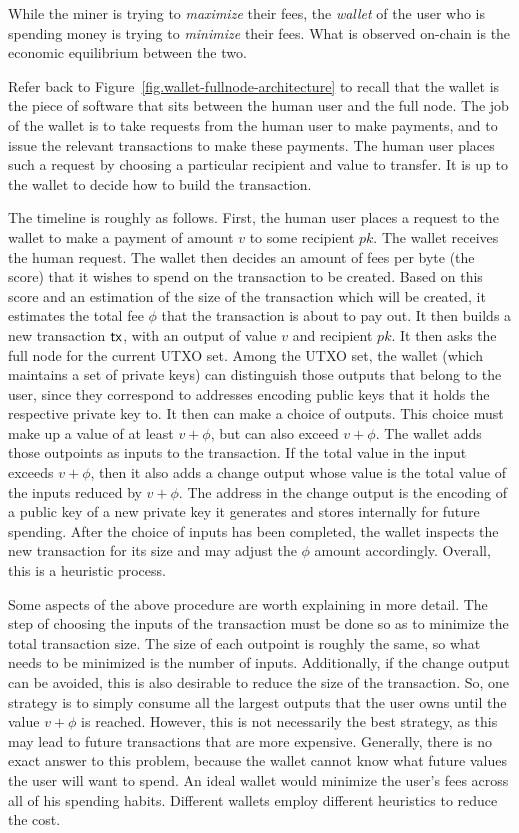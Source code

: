 While the miner is trying to \emph{maximize} their fees, the \emph{wallet} of the user
who is spending money is trying to \emph{minimize} their fees. What is observed on-chain
is the economic equilibrium between the two.

Refer back to Figure~\ref{fig.wallet-fullnode-architecture} to recall that the wallet
is the piece of software that sits between the human user and the full node. The job of
the wallet is to take requests from the human user to make payments, and to issue the relevant
transactions to make these payments. The human user places such a request by choosing a particular
recipient and value to transfer. It is up to the wallet to decide how to build the transaction.

The timeline is roughly as follows. First, the human user places a request to the wallet
to make a payment of amount $v$ to some recipient $pk$. The wallet receives the human
request. The wallet then decides an amount of fees per byte (the score) that it wishes to spend
on the transaction to be created. Based on this score and an estimation of the size of the
transaction which will be created, it estimates the total fee $\phi$ that the transaction is about
to pay out. It then builds a new transaction
$\mathsf{tx}$, with an output of value $v$ and recipient $pk$. It then asks the full node for
the current UTXO set. Among the UTXO set, the wallet (which maintains a set of private keys)
can distinguish those outputs that belong to the user, since they correspond to addresses
encoding public keys that it holds the respective private key to. It then can make a choice
of outputs. This choice must make up a value of at least $v + \phi$, but can also exceed $v + \phi$.
The wallet adds those outpoints as inputs to the transaction. If the total value in the input
exceeds $v + \phi$, then it also adds a change output whose value is the total value of the
inputs reduced by $v + \phi$. The address in the change output is the encoding of a public
key of a new private key it generates and stores internally for future spending. After
the choice of inputs has been completed, the wallet inspects the new transaction for
its size and may adjust the $\phi$ amount accordingly. Overall, this is a heuristic
process.

Some aspects of the above procedure are worth explaining in more detail. The step of choosing
the inputs of the transaction must be done so as to minimize the total transaction size.
The size of each outpoint is roughly the same, so what needs to be minimized is the number
of inputs. Additionally, if the change output can be avoided, this is also desirable to
reduce the size of the transaction. So, one strategy is to simply consume all the largest
outputs that the user owns until the value $v + \phi$ is reached. However, this is not
necessarily the best strategy, as this may lead to future transactions that are more expensive.
Generally, there is no exact answer to this problem, because the wallet cannot know what
future values the user will want to spend. An ideal wallet would minimize the user's fees
across all of his spending habits. Different wallets employ different heuristics to reduce
the cost.

